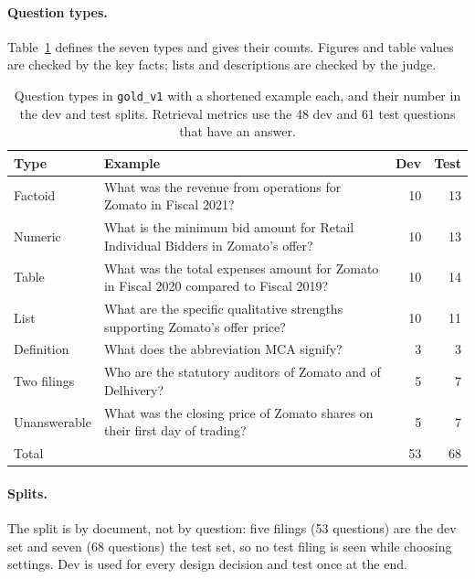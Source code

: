 \documentclass[11pt,a4paper]{article}
\begin{document}
\paragraph{Question types.} Table~\ref{tab:gold} defines the seven types and gives their counts. Figures and table values are checked by the key facts; lists and descriptions are checked by the judge.

\begin{table}[t]
\centering
\caption{Question types in \texttt{gold\_v1} with a shortened example each, and their number in the dev and test splits. Retrieval metrics use the 48 dev and 61 test questions that have an answer.}
\label{tab:gold}
\small
\begin{tabular}{@{}p{2.3cm}p{9.0cm}rr@{}}
\toprule
Type & Example & Dev & Test \\
\midrule
Factoid & What was the revenue from operations for Zomato in Fiscal 2021? & 10 & 13 \\
Numeric & What is the minimum bid amount for Retail Individual Bidders in Zomato's offer? & 10 & 13 \\
Table & What was the total expenses amount for Zomato in Fiscal 2020 compared to Fiscal 2019? & 10 & 14 \\
List & What are the specific qualitative strengths supporting Zomato's offer price? & 10 & 11 \\
Definition & What does the abbreviation MCA signify? & 3 & 3 \\
Two filings & Who are the statutory auditors of Zomato and of Delhivery? & 5 & 7 \\
Unanswerable & What was the closing price of Zomato shares on their first day of trading? & 5 & 7 \\
\midrule
Total & & 53 & 68 \\
\bottomrule
\end{tabular}
\end{table}

\paragraph{Splits.} The split is by document, not by question: five filings (53 questions) are the dev set and seven (68 questions) the test set, so no test filing is seen while choosing settings. Dev is used for every design decision and test once at the end.
\end{document}
